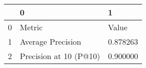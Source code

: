\begin{tabular}{lll}
\toprule
 & 0 & 1 \\
\midrule
0 & Metric & Value \\
1 & Average Precision & 0.878263 \\
2 & Precision at 10 (P@10) & 0.900000 \\
\bottomrule
\end{tabular}
